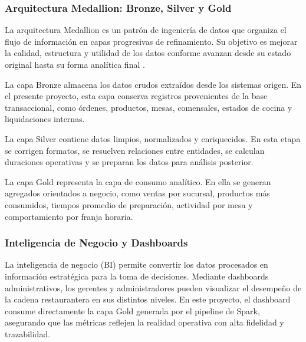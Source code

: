 \subsubsection{Arquitectura Medallion: Bronze, Silver y Gold}

La arquitectura Medallion es un patrón de ingeniería de datos que organiza el flujo de
información en capas progresivas de refinamiento. Su objetivo es mejorar la calidad,
estructura y utilidad de los datos conforme avanzan desde su estado original hasta su forma
analítica final \cite{armbrust2021lakehouse, reis2022fundamentals}.

La capa Bronze almacena los datos crudos extraídos desde los sistemas origen. En el presente
proyecto, esta capa conserva registros provenientes de la base transaccional, como órdenes,
productos, mesas, comensales, estados de cocina y liquidaciones internas.

La capa Silver contiene datos limpios, normalizados y enriquecidos. En esta etapa se corrigen
formatos, se resuelven relaciones entre entidades, se calculan duraciones operativas y se
preparan los datos para análisis posterior.

La capa Gold representa la capa de consumo analítico. En ella se generan agregados orientados
a negocio, como ventas por sucursal, productos más consumidos, tiempos promedio de preparación,
actividad por mesa y comportamiento por franja horaria.

\subsubsection{Inteligencia de Negocio y Dashboards}

La inteligencia de negocio (BI) permite convertir los datos procesados en información
estratégica para la toma de decisiones. Mediante dashboards administrativos, los gerentes
y administradores pueden visualizar el desempeño de la cadena restaurantera en sus distintos
niveles. En este proyecto, el dashboard consume directamente la capa Gold generada por el
pipeline de Spark, asegurando que las métricas reflejen la realidad operativa con alta
fidelidad y trazabilidad.

\newpage